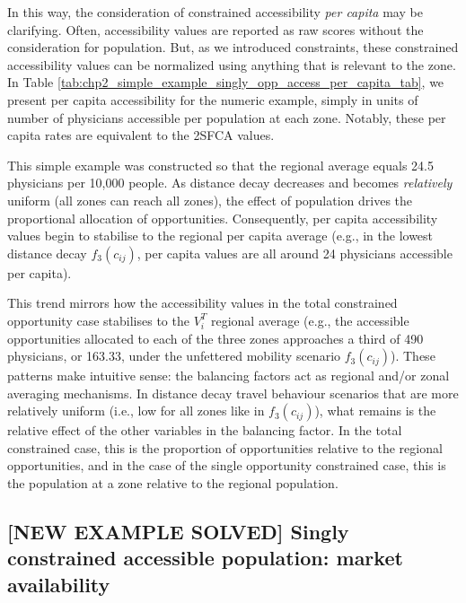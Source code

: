 \documentclass[
11pt, %
oneside, %
english, %
singlespacing, %
]{macthesis} %
\begin{document}
In this way, the consideration of constrained accessibility \emph{per capita} may be clarifying. Often, accessibility values are reported as raw scores without the consideration for population. But, as we introduced constraints, these constrained accessibility values can be normalized using anything that is relevant to the zone. In Table \ref{tab:chp2_simple_example_singly_opp_access_per_capita_tab}, we present per capita accessibility for the numeric example, simply in units of number of physicians accessible per population at each zone. Notably, these per capita rates are equivalent to the 2SFCA values.



This simple example was constructed so that the regional average equals 24.5 physicians per 10,000 people. As distance decay decreases and becomes \emph{relatively} uniform (all zones can reach all zones), the effect of population drives the proportional allocation of opportunities. Consequently, per capita accessibility values begin to stabilise to the regional per capita average (e.g., in the lowest distance decay \(f_3(c_{ij})\), per capita values are all around 24 physicians accessible per capita).

This trend mirrors how the accessibility values in the total constrained opportunity case stabilises to the \(V_i^T\) regional average (e.g., the accessible opportunities allocated to each of the three zones approaches a third of 490 physicians, or 163.33, under the unfettered mobility scenario \(f_3(c_{ij})\)). These patterns make intuitive sense: the balancing factors act as regional and/or zonal averaging mechanisms. In distance decay travel behaviour scenarios that are more relatively uniform (i.e., low for all zones like in \(f_3(c_{ij})\)), what remains is the relative effect of the other variables in the balancing factor. In the total constrained case, this is the proportion of opportunities relative to the regional opportunities, and in the case of the single opportunity constrained case, this is the population at a zone relative to the regional population.

\subsection{{[}NEW EXAMPLE SOLVED{]} Singly constrained accessible population: market availability}\label{new-example-solved-singly-constrained-accessible-population-market-availability}
\end{document}
